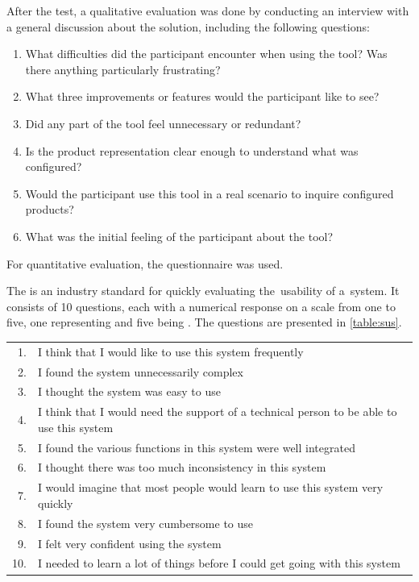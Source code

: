 After the test, a qualitative evaluation was done by conducting an interview with a general discussion about the solution, including the following questions:
\begin{enumerate}
    \item What difficulties did the participant encounter when using the tool? Was there anything particularly frustrating?
    \item What three improvements or features would the participant like to see?
    \item Did any part of the tool feel unnecessary or redundant?
    \item Is the product representation clear enough to understand what was configured?
    \item Would the participant use this tool in a real scenario to inquire configured products?
    \item What was the initial feeling of the participant about the tool?
\end{enumerate}

For quantitative evaluation, the  questionnaire was used.

The  is an industry standard for quickly evaluating the~usability of a~system. It consists of 10 questions, each with a numerical response on a scale from one to five, one representing  and five being . The questions are presented in \autoref{table:sus}.~\cite{Sus}

\begin{table}[htb]
\centering
\begin{tabular}{r>{\raggedright\arraybackslash}p{11.5cm}}
\toprule
1. & I think that I would like to use this system frequently \\
2. & I found the system unnecessarily complex \\
3. & I thought the system was easy to use \\
4. & I think that I would need the support of a technical person to be able to use this system \\
5. & I found the various functions in this system were well integrated \\
6. & I thought there was too much inconsistency in this system \\
7. & I would imagine that most people would learn to use this system very quickly \\
8. & I found the system very cumbersome to use \\
9. & I felt very confident using the system \\
10. &  I needed to learn a lot of things before I could get going with this system \\
\bottomrule
\end{tabular}
\label{table:sus}
\end{table}

